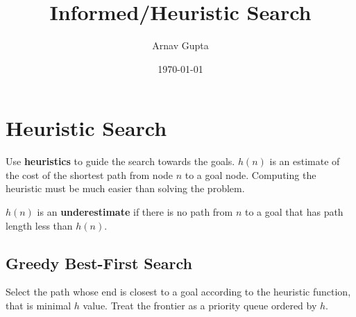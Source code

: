 \documentclass[11pt]{article}
\author{Arnav Gupta}
\date{\today}
\title{Informed/Heuristic Search}
\begin{document}
\maketitle
\tableofcontents

\section{Heuristic Search}
\label{sec:org7aa712d}
Use \textbf{heuristics} to guide the search towards the goals.
\(h(n)\) is an estimate of the cost of the shortest path from node \(n\) to a goal node.
Computing the heuristic must be much easier than solving the problem.

\(h(n)\) is an \textbf{underestimate} if there is no path from \(n\) to a goal that has path length
less than \(h(n)\).
\subsection{Greedy Best-First Search}
\label{sec:org9f531f3}
Select the path whose end is closest to a goal according to the heuristic function, that is minimal
\(h\) value.
Treat the frontier as a priority queue ordered by \(h\).
\end{document}
